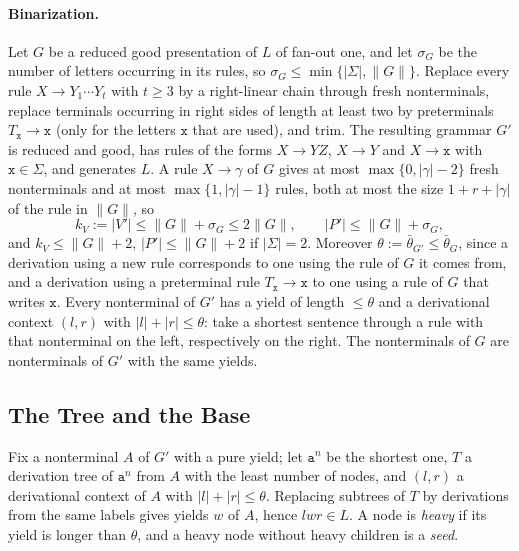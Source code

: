 \paragraph{Binarization.}
Let $G$ be a reduced good presentation of $L$ of fan-out one, and let
$\sigma_G$ be the number of letters occurring in its rules, so
$\sigma_G\le\min\{|\Sigma|,\|G\|\}$.  Replace every rule $X\to Y_1\cdots Y_t$
with $t\ge3$ by a right-linear chain through fresh nonterminals, replace
terminals occurring in right sides of length at least two by preterminals
$T_{\mathtt x}\to\mathtt x$ (only for the letters $\mathtt x$ that are used), and trim.
The resulting grammar $G'$ is reduced and good, has rules of the forms
$X\to YZ$, $X\to Y$ and $X\to\mathtt x$ with $\mathtt x\in\Sigma$, and generates $L$.
A rule $X\to\gamma$ of $G$ gives at most $\max\{0,|\gamma|-2\}$ fresh
nonterminals and at most $\max\{1,|\gamma|-1\}$ rules, both at most the size
$1+r+|\gamma|$ of the rule in $\|G\|$, so
\[
 k_V:=|V'|\le\|G\|+\sigma_G\le2\|G\|,\qquad |P'|\le\|G\|+\sigma_G,
\]
and $k_V\le\|G\|+2$, $|P'|\le\|G\|+2$ if $|\Sigma|=2$.  Moreover
$\theta:=\bar\theta_{G'}\le\bar\theta_G$, since a derivation using a new rule
corresponds to one using the rule of $G$ it comes from, and a derivation using a
preterminal rule $T_{\mathtt x}\to\mathtt x$ to one using a rule of $G$ that writes
$\mathtt x$.  Every nonterminal of
$G'$ has a yield of length $\le\theta$ and a derivational context $(l,r)$ with
$|l|+|r|\le\theta$: take a shortest sentence through a rule with that
nonterminal on the left, respectively on the right.  The nonterminals of $G$
are nonterminals of $G'$ with the same yields.

\subsection{The Tree and the Base}

Fix a nonterminal $A$ of $G'$ with a pure yield; let $\mathtt a^n$ be the
shortest one, $T$ a derivation tree of $\mathtt a^n$ from $A$ with the least
number of nodes, and $(l,r)$ a derivational context of $A$ with
$|l|+|r|\le\theta$.  Replacing subtrees of $T$ by derivations from the same
labels gives yields $w$ of $A$, hence $lwr\in L$.  A node is \emph{heavy} if
its yield is longer than $\theta$, and a heavy node without heavy children is a
\emph{seed}.

